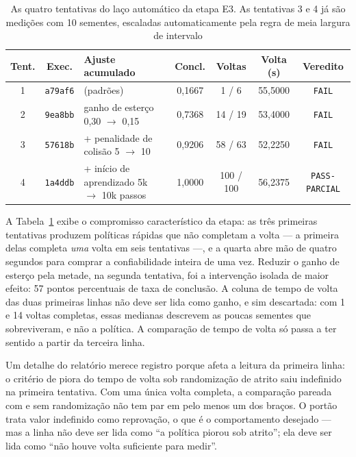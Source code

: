 \begin{table}[h]
    \centering
    \footnotesize
    \begin{tabular}{|c|c|p{3.6cm}|c|c|c|c|}
        \hline
        \textbf{Tent.} & \textbf{Exec.} & \textbf{Ajuste acumulado} &
        \textbf{Concl.} & \textbf{Voltas} & \textbf{Volta (s)} &
        \textbf{Veredito} \\
        \hline
        1 & \texttt{a79af6} & (padrões) & 0,1667 & 1 / 6 & 55,5000 &
        \texttt{FAIL} \\
        \hline
        2 & \texttt{9ea8bb} & ganho de esterço 0,30 $\to$ 0,15 & 0,7368 &
        14 / 19 & 53,4000 & \texttt{FAIL} \\
        \hline
        3 & \texttt{57618b} & + penalidade de colisão 5 $\to$ 10 & 0,9206 &
        58 / 63 & 52,2250 & \texttt{FAIL} \\
        \hline
        4 & \texttt{1a4ddb} & + início de aprendizado 5k $\to$ 10k passos &
        1,0000 & 100 / 100 & 56,2375 & \texttt{PASS-PARCIAL} \\
        \hline
    \end{tabular}
    \caption{As quatro tentativas do laço automático da etapa E3. As tentativas
    3 e 4 já são medições com 10 sementes, escaladas automaticamente pela regra
    de meia largura de intervalo}
    \label{tab:res_e3_laco}
\end{table}

A Tabela~\ref{tab:res_e3_laco} exibe o compromisso característico da etapa: as
três primeiras tentativas produzem políticas rápidas que não completam a volta ---
a primeira delas completa \textit{uma} volta em seis tentativas ---, e a quarta
abre mão de quatro segundos para comprar a confiabilidade inteira de uma vez.
Reduzir o ganho de esterço pela metade, na segunda tentativa, foi a intervenção
isolada de maior efeito: 57 pontos percentuais de taxa de conclusão. A coluna de
tempo de volta das duas primeiras linhas não deve ser lida como ganho, e sim
descartada: com 1 e 14 voltas completas, essas medianas descrevem as poucas
sementes que sobreviveram, e não a política. A comparação de tempo de volta só
passa a ter sentido a partir da terceira linha.

Um detalhe do relatório merece registro porque afeta a leitura da primeira linha:
o critério de piora do tempo de volta sob randomização de atrito saiu
indefinido na primeira tentativa. Com uma única volta completa, a comparação
pareada com e sem randomização não tem par em pelo menos um dos braços. O portão
trata valor indefinido como reprovação, o que é o comportamento desejado --- mas
a linha não deve ser lida como ``a política piorou sob atrito''; ela deve ser
lida como ``não houve volta suficiente para medir''.

